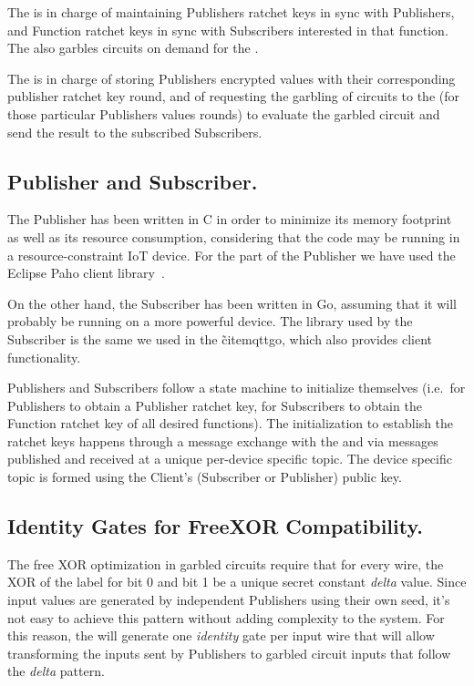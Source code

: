The \garbler is in charge of maintaining Publishers ratchet keys in sync
with Publishers, and Function ratchet keys in sync with Subscribers interested
in that function.  The \garbler also garbles circuits on demand for the
\broker.

The \broker is in charge of storing Publishers encrypted values with their
corresponding publisher ratchet key round, and of requesting the garbling of
circuits to the \garbler (for those particular Publishers values rounds) to
evaluate the garbled circuit and send the result to the subscribed Subscribers.

\vspace{-4pt}
\subsection{Publisher and Subscriber.}

The Publisher has been written in C in order to minimize its memory footprint
as well as its resource consumption, considering that the code may be running
in a resource-constraint IoT device.  For the \MQTT{} part of the Publisher we
have used the Eclipse Paho client library~\cite{paho}.

On the other hand, the Subscriber has been written in Go, assuming that it
will probably be running on a more powerful device.  The \MQTT{} library used
by the Subscriber is the same we used in the \broker\~cite{mqttgo}, which also
provides client functionality.

Publishers and Subscribers follow a state machine to initialize themselves
(i.e.\ for Publishers to obtain a Publisher ratchet key, for Subscribers to
obtain the Function ratchet key of all desired functions).  The initialization
to establish the ratchet keys happens through a message exchange with the
\broker and \garbler via \MQTT{} messages published and received at a unique
per-device specific topic.  The device specific topic is formed using the
Client's (Subscriber or Publisher) public key.

\vspace{-4pt}
\subsection{Identity Gates for FreeXOR Compatibility.}

The free XOR optimization in garbled circuits require that for every wire, the
XOR of the label for bit 0 and bit 1 be a unique secret constant \emph{delta}
value.  Since input values are generated by independent Publishers using their
own seed, it's not easy to achieve this pattern without adding complexity to
the system.  For this reason, the \garbler will generate one \emph{identity}
gate per input wire that will allow transforming the inputs sent by Publishers
to garbled circuit inputs that follow the \emph{delta} pattern.


